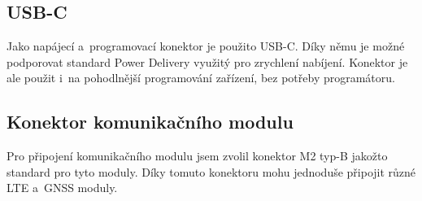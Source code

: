 \subsection{USB-C}
Jako napájecí a~programovací konektor je použito USB-C.
Díky němu je možné podporovat standard Power Delivery využitý pro zrychlení nabíjení.
Konektor je ale použit i~na pohodlnější programování zařízení, bez potřeby programátoru.

\subsection{Konektor komunikačního modulu}
Pro připojení komunikačního modulu jsem zvolil konektor M2 typ-B jakožto standard pro tyto moduly.
Díky tomuto konektoru mohu jednoduše připojit různé LTE a~GNSS moduly.